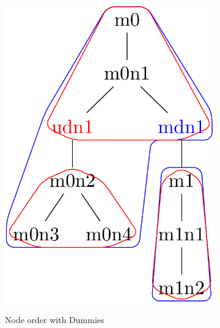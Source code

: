 \documentclass{article}
\begin{document}
\begin{figure}[ht]
\begin{subfigure}{3cm}
		\includegraphics[scale=0.2]{F3C2Tree}
		\caption{Node order with Dummies}
		\label{factory:subim2}
	\end{subfigure}
	\begin{subfigure}{2.5cm}

\end{subfigure}
\end{figure}
\end{document}
